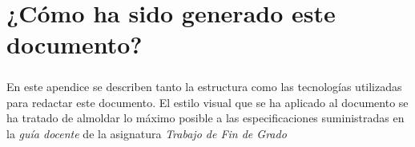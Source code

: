 \documentclass{subfiles}
\begin{document}
  \chapter{¿Cómo ha sido generado este documento?}

    \paragraph{}
    En este apendice se describen tanto la estructura como las tecnologías utilizadas para redactar este documento. El estilo visual que se ha aplicado al documento se ha tratado de almoldar lo máximo posible a las especificaciones suministradas en la \emph{guía docente} de la asignatura \emph{Trabajo de Fin de Grado} \cite{uva:tfg-teaching-guide}
\end{document}
